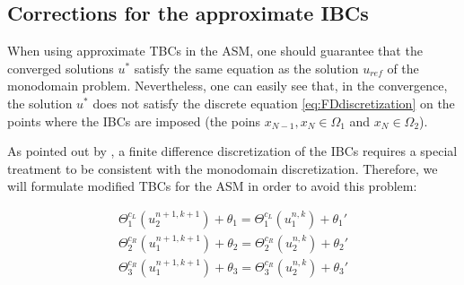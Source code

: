 \endgroup


\subsection{Corrections for the approximate IBCs}

\indent When using approximate TBCs in the ASM, one should guarantee that the converged solutions $u^*$ satisfy the same equation as the solution $u_{ref}$ of the monodomain problem. Nevertheless, one can easily see that, in the convergence, the solution $u^*$ does not satisfy the discrete equation \eqref{eq:FDdiscretization} on the points where the IBCs are imposed (the poins $x_{N-1},x_N \in \Omega_1$ and $x_N \in \Omega_2$). 

\indent As pointed out by \cite{Gander2001}, a finite difference discretization of the IBCs requires a special treatment to be consistent with the monodomain discretization. Therefore, we will formulate modified TBCs for the ASM in order to avoid this problem:

\begin{equation}
	\label{eq:correctedTBC}
    \begin{gathered}
        \Theta_1^{c_L}(u_2^{n+1,k+1}) + \theta_1 = \Theta_1^{c_L}(u_1^{n,k}) + \theta_1' \\
        \Theta_2^{c_R}(u_1^{n+1,k+1}) + \theta_2 = \Theta_2^{c_R}(u_2^{n,k}) + \theta_2' \\
        \Theta_3^{c_R}(u_1^{n+1,k+1}) + \theta_3 = \Theta_3^{c_R}(u_2^{n,k}) + \theta_3'
    \end{gathered}
\end{equation}

